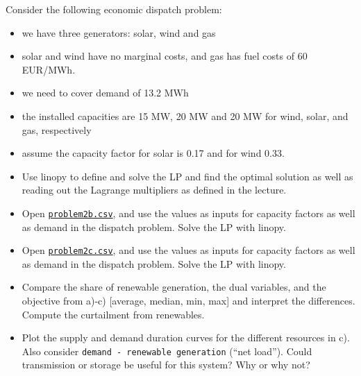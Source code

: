 \documentclass[10pt]{article}
\newenvironment{problem}[2][Problem]{\begin{trivlist}
\item[\hskip \labelsep {\bfseries #1}\hskip \labelsep {\bfseries #2.}]}{\end{trivlist}}
\begin{document}
\begin{problem}{2.2}
	
	Consider the following economic dispatch problem: 
	\begin{itemize}
		\item we have three generators: solar, wind and gas
		\item solar and wind have no marginal costs, and gas has fuel costs of 60 EUR/MWh.
		\item we need to cover demand of 13.2 MWh
		\item the installed capacities are 15 MW, 20 MW and 20 MW for wind, solar, and gas, respectively
		\item assume the capacity factor for solar is 0.17 and for wind 0.33.
	\end{itemize}

	
	\begin{itemize}
		\item[a)] Use linopy to define and solve the LP and find the optimal solution as well as reading out the Lagrange multipliers as defined in the lecture. 
		\item[b)] Open \href{problem2b.csv}{\texttt{problem2b.csv}}, and use the values as inputs for capacity factors as well as demand in the dispatch problem. Solve the LP with linopy.
		\item[c)] Open \href{problem2c.csv}{\texttt{problem2c.csv}}, and use the values as inputs for capacity factors as well as demand in the dispatch problem. Solve the LP with linopy.
		\item[d)] Compare the share of renewable generation, the dual variables, and the objective from a)-c) [average, median, min, max] and interpret the differences. Compute the curtailment from renewables.
		\item[e)] Plot the supply and demand duration curves for the different resources in c). Also consider \texttt{demand - renewable generation} (``net load''). Could transmission or storage be useful for this system? Why or why not?
	\end{itemize}

\end{problem}

\
\end{document}
